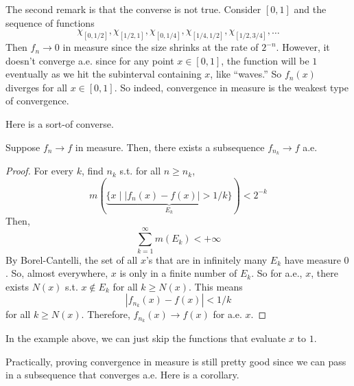   The second remark is that the converse is not true. Consider $[0, 1]$ and the sequence of functions 
  \begin{equation}
    \chi_{[0, 1/2]}, \chi_{[1/2, 1]}, \chi_{[0, 1/4]}, \chi_{[1/4, 1/2]}, \chi_{[1/2, 3/4]}, \ldots 
  \end{equation}
  Then $f_n \to 0$ in measure since the size shrinks at the rate of $2^{-n}$. However, it doesn't converge a.e. since for any point $x \in [0, 1]$, the function will be $1$ eventually as we hit the subinterval containing $x$, like ``waves.'' So $f_n(x)$ diverges for all $x \in [0, 1]$. So indeed, convergence in measure is the weakest type of convergence. 

  Here is a sort-of converse. 

  \begin{theorem}[Riesz]
    Suppose $f_n \to f$ in measure. Then, there exists a subsequence $f_{n_k} \to f$ a.e. 
  \end{theorem}
  \begin{proof}
    For every $k$, find $n_k$ s.t. for all $n \geq n_k$,
    \begin{equation}
      m(\underbrace{\{x \mid |f_n(x) - f(x)| > 1/k\}}_{E_k}) < 2^{-k}
    \end{equation}
    Then, 
    \begin{equation}
      \sum_{k=1}^\infty m(E_k) < +\infty
    \end{equation}
    By Borel-Cantelli, the set of all $x$'s that are in infinitely many $E_k$ have measure $0$. So, almost everywhere, $x$ is only in a finite number of $E_k$. So for a.e., $x$, there exists $N(x)$ s.t. $x \not\in E_k$ for all $k \geq N(x)$. This means 
    \begin{equation}
      | f_{n_k} (x) - f(x)| < 1/k 
    \end{equation}
    for all $k \geq N(x)$. Therefore, $f_{n_k} (x) \to f(x)$ for a.e. $x$. 
  \end{proof}

  In the example above, we can just skip the functions that evaluate $x$ to $1$.  

  Practically, proving convergence in measure is still pretty good since we can pass in a subsequence that converges a.e. Here is a corollary. 

